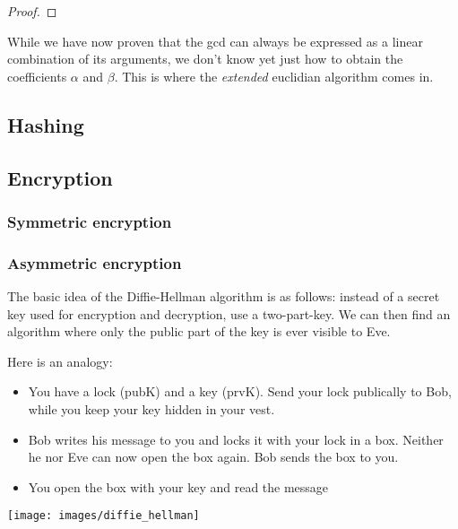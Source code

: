 \begin{proof}
\end{proof}

While we have now proven that the gcd can always be expressed as a linear combination of its arguments, we don't know yet just how to obtain the coefficients $\alpha$ and $\beta$. This is where the \emph{extended} euclidian algorithm comes in. 




\subsection{Hashing}

\subsection{Encryption}

\subsubsection{Symmetric encryption}

\subsubsection{Asymmetric encryption}

The basic idea of the Diffie-Hellman algorithm is as follows: instead of a secret key used for encryption and decryption, use a two-part-key. We can then find an algorithm where only the public part of the key is ever visible to Eve. 

Here is an analogy:
\begin{itemize}
	\item You have a lock (pubK) and a key (prvK). Send your lock publically to Bob, while you keep your key hidden in your vest. 
	\item Bob writes his message to you and locks it with your lock in a box. Neither he nor Eve can now open the box again. Bob sends the box to you.
	\item You open the box with your key and read the message
\end{itemize}

\texttt{[image: images/diffie\_hellman]}

